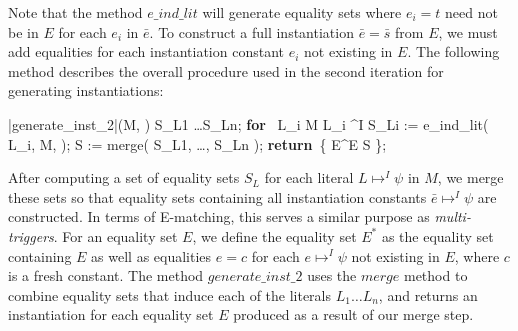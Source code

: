 \documentclass{llncs}
\def\RETURN{\keyword{return}\ }
\def\ENDPROC{\untab}
\def\DOFOR{\qtab\keyword{for}\ }
\def\ENDFOR{\untab}
\def\keyword#1{\mbox{\normalshape\bf #1}}
\begin{document}
Note that the method $e\_ind\_lit$ will generate equality sets where $e_i = t$ need not be in $E$ for each $e_i$ in $\bar{e}$.
To construct a full instantiation $\bar{e} = \bar{s}$ from $E$, we must add equalities for each instantiation constant $e_i$ not existing in $E$.
The following method describes the overall procedure used in the second iteration for generating instantiations:

\begin{minipage}[t]{.4\linewidth}
\begin{program}
\PROC |generate\_inst_2|(M, \psi) \BODY
S_{L1} \ldots S_{Ln};
\DOFOR {} L_i \in M  L_i \mapsto^I \psi
  S_{Li} := e\_ind\_lit( L_i, M, \psi );
\ENDFOR
S := merge( S_{L1}, \ldots, S_{Ln} );
\RETURN \{ E^\ast \mid E \in S \};
\ENDPROC
\end{program}
\end{minipage}

After computing a set of equality sets $S_L$ for each literal $L \mapsto^I \psi$ in $M$, we merge these sets so that equality sets containing all instantiation constants $\bar{e} \mapsto^I \psi$ are constructed.
In terms of E-matching, this serves a similar purpose as \emph{multi-triggers}.
For an equality set $E$, we define the equality set $E^\ast$ as the equality set containing $E$ as well as equalities $e = c$ for each $e \mapsto^I \psi$ not existing in $E$, where $c$ is a fresh constant.
The method $generate\_inst\_2$ uses the $merge$ method to combine equality sets that induce each of the literals $L_1 \ldots L_n$, and returns an instantiation for each equality set $E$ produced as a result of our merge step.
\end{document}
